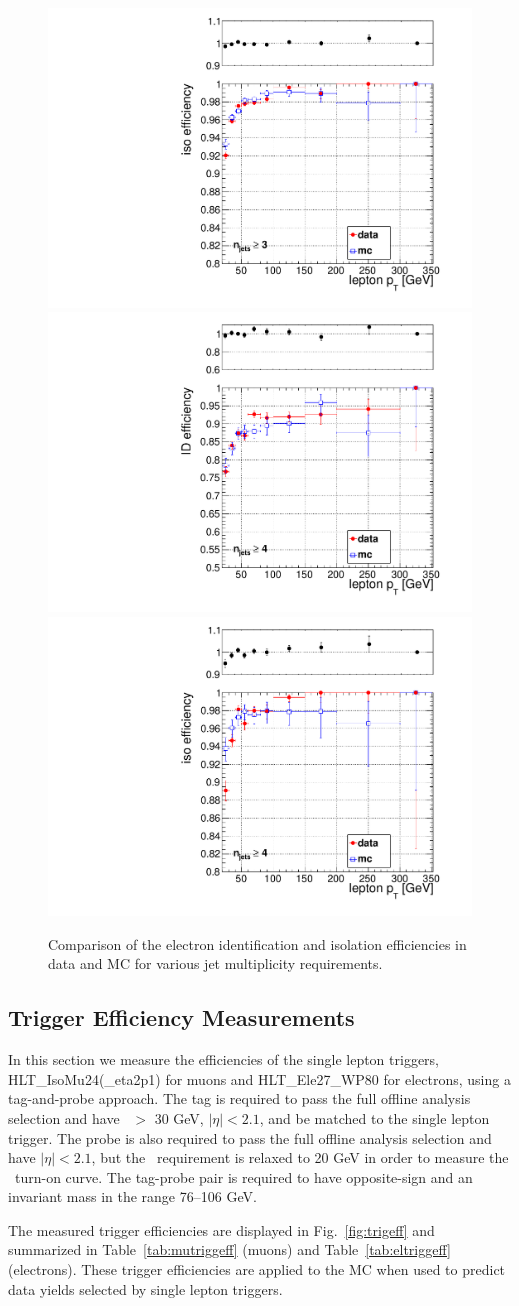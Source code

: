 \begin{figure}[hbt]
\begin{center}
	\includegraphics[width=0.3\linewidth]{plots/el_iso_njets3.pdf}
	\includegraphics[width=0.3\linewidth]{plots/el_id_njets4.pdf}%
	\includegraphics[width=0.3\linewidth]{plots/el_iso_njets4.pdf}
	\caption{
	  \label{fig:eltnpeff} Comparison of the electron identification and isolation efficiencies in data and MC for various jet multiplicity requirements. }  
      \end{center}
\end{figure}

\clearpage


\subsection{Trigger Efficiency Measurements}
\label{sec:trg}

In this section we measure the efficiencies of the single lepton triggers, HLT\_IsoMu24(\_eta2p1) for muons and HLT\_Ele27\_WP80 for electrons, using a tag-and-probe
approach. The tag is required to pass the full offline analysis selection and have \pt\ $>$ 30 GeV, $|\eta|<2.1$, and be matched to the single
lepton trigger. The probe is also required to pass the full offline analysis selection and have $|\eta|<2.1$, but the \pt\ requirement is relaxed to 20 GeV
in order to measure the \pt\ turn-on curve. The tag-probe pair is
required to have opposite-sign and an invariant mass in the range
76--106 GeV.

The measured trigger efficiencies are displayed in Fig.~\ref{fig:trigeff} and summarized in Table~\ref{tab:mutriggeff} (muons) and Table~\ref{tab:eltriggeff} (electrons).
These trigger efficiencies are applied to the MC when used to predict data yields selected by single lepton triggers.


